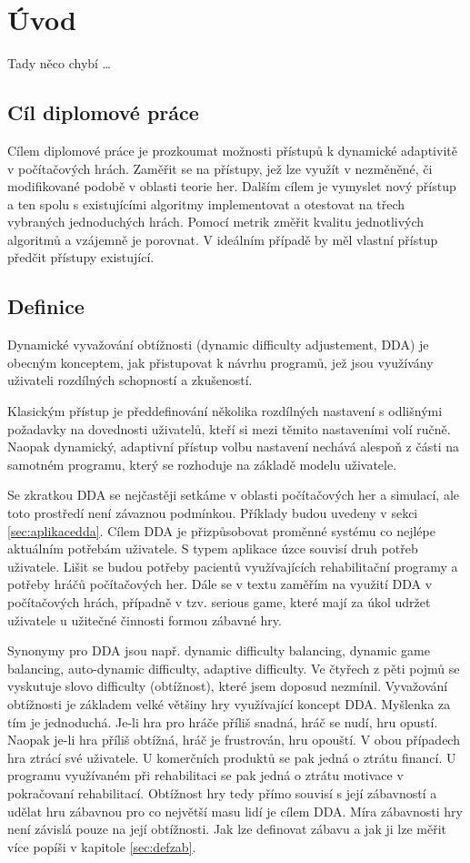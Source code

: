 \chapter{Úvod}
Tady něco chybí \dots

\section{Cíl diplomové práce}

Cílem diplomové práce je prozkoumat možnosti přístupů k dynamické adaptivitě v počítačových hrách. Zaměřit se na přístupy, jež lze využít v nezměněné, či modifikované podobě v oblasti teorie her. Dalším cílem je vymyslet nový přístup a ten spolu s existujícími algoritmy implementovat a otestovat na třech vybraných jednoduchých hrách. Pomocí metrik změřit kvalitu jednotlivých algoritmů a vzájemně je porovnat. V ideálním případě by měl vlastní přístup předčit přístupy existující.

\section{Definice}

Dynamické vyvažování obtížnosti (dynamic difficulty adjustement, DDA) je obecným konceptem, jak přistupovat k návrhu programů, jež jsou využívány uživateli rozdílných schopností a zkušeností. 

Klasickým přístup je předdefinování několika rozdílných nastavení s odlišnými požadavky na dovednosti uživatelů, kteří si mezi těmito nastaveními volí ručně. Naopak dynamický, adaptivní přístup volbu nastavení nechává alespoň z části na samotném programu, který se rozhoduje na základě modelu uživatele.

Se zkratkou DDA se nejčastěji setkáme v oblasti počítačových her a simulací, ale toto prostředí není závaznou podmínkou. Příklady budou uvedeny v sekci \ref{sec:aplikacedda}. Cílem DDA je přizpůsobovat proměnné systému co nejlépe aktuálním potřebám uživatele.  S typem aplikace úzce souvisí druh potřeb uživatele. Lišit se budou potřeby pacientů využívajících rehabilitační programy a potřeby hráčů počítačových her. Dále se v textu zaměřím na využití DDA v počítačových hrách, případně v tzv. serious game, které mají za úkol udržet uživatele u užitečné činnosti formou zábavné hry.

Synonymy pro DDA jsou např. dynamic difficulty balancing, dynamic game balancing, auto-dynamic difficulty, adaptive difficulty. Ve čtyřech z pěti pojmů se vyskutuje slovo difficulty (obtížnost), které jsem doposud nezmínil. Vyvažování obtížnosti je základem velké většiny hry využívající koncept DDA. Myšlenka za tím je jednoduchá. Je-li hra pro hráče příliš snadná, hráč se nudí, hru opustí. Naopak je-li hra příliš obtížná, hráč je frustrován, hru opouští. V obou případech hra ztrácí své uživatele. U komerčních produktů se pak jedná o ztrátu financí. U programu využívaném při rehabilitaci se pak jedná o ztrátu motivace v pokračovaní rehabilitací. Obtížnost hry tedy přímo souvisí s její zábavností a udělat hru zábavnou pro co největší masu lidí je cílem DDA. Míra zábavnosti hry není závislá pouze na její obtížnosti. Jak lze definovat zábavu a jak ji lze měřit více popíši v kapitole \ref{sec:defzab}. 

